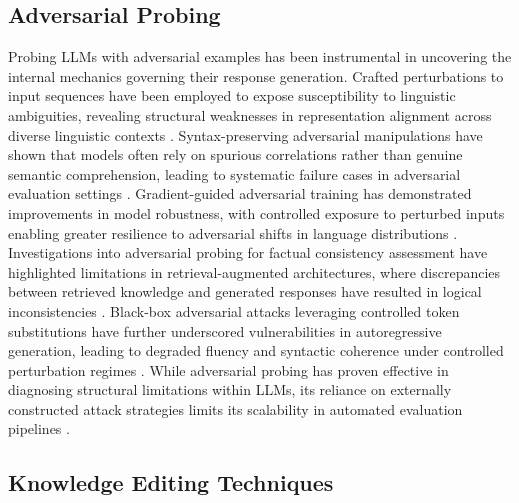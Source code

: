 \documentclass[5p,times]{elsarticle}
\begin{document}
\subsection{Adversarial Probing}

Probing LLMs with adversarial examples has been instrumental in uncovering the internal mechanics governing their response generation. Crafted perturbations to input sequences have been employed to expose susceptibility to linguistic ambiguities, revealing structural weaknesses in representation alignment across diverse linguistic contexts \cite{laurent2024optimizing}. Syntax-preserving adversarial manipulations have shown that models often rely on spurious correlations rather than genuine semantic comprehension, leading to systematic failure cases in adversarial evaluation settings \cite{anvito2024enhancing}. Gradient-guided adversarial training has demonstrated improvements in model robustness, with controlled exposure to perturbed inputs enabling greater resilience to adversarial shifts in language distributions \cite{geline2024linguistic}. Investigations into adversarial probing for factual consistency assessment have highlighted limitations in retrieval-augmented architectures, where discrepancies between retrieved knowledge and generated responses have resulted in logical inconsistencies \cite{mcintosh2024inadequacy}. Black-box adversarial attacks leveraging controlled token substitutions have further underscored vulnerabilities in autoregressive generation, leading to degraded fluency and syntactic coherence under controlled perturbation regimes \cite{sang2024evaluating}. While adversarial probing has proven effective in diagnosing structural limitations within LLMs, its reliance on externally constructed attack strategies limits its scalability in automated evaluation pipelines \cite{kirchenbauer2024hallucination}.

\subsection{Knowledge Editing Techniques}
\end{document}

